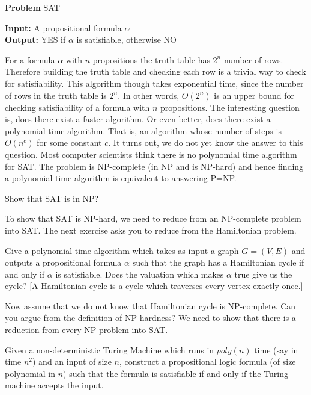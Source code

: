\begin{problem}
\caption*{{\bf Problem} SAT}
{\bf Input: } A propositional formula $\alpha$ \\
{\bf Output: } YES if $\alpha$ is satisfiable, otherwise NO
\label{prblm:sat}
\end{problem}

For a formula $\alpha$ with $n$ propositions the truth table has $2^n$ number of rows. Therefore building the truth table and checking each row is a trivial way to check for satisfiability. This algorithm though takes exponential time, since the number of rows in the truth table is $2^n$. 
In other words, $O(2^n)$ is an upper bound for checking satisfiability of a formula with $n$ propositions. The interesting question is, does there exist a faster algorithm. Or even better, does there exist a polynomial time algorithm. That is, an algorithm whose number of steps is $O(n^c)$ for some constant $c$. It turns out, we do not yet know the answer to this question. Most computer scientists think there is no polynomial time algorithm for SAT. The problem is NP-complete (in NP and is NP-hard) and hence finding a polynomial time algorithm is equivalent to answering P=NP. 

\begin{exercise}
\label{exercise:satisnp}
Show that SAT is in NP? 
\end{exercise}

To show that SAT is NP-hard, we need to reduce from an NP-complete problem into SAT. The next exercise asks you to reduce from the Hamiltonian problem.

\begin{exercise}
\label{exercise:satisnphard}
Give a polynomial time algorithm which takes as input a graph $G=(V,E)$ and outputs a propositional formula $\alpha$ such that the graph has a Hamiltonian cycle if and only if $\alpha$ is satisfiable. Does the valuation which makes $\alpha$ true give us the cycle? [A Hamiltonian cycle is a cycle which traverses every vertex exactly once.]
\end{exercise}

Now assume that we do not know that Hamiltonian cycle is NP-complete. Can you argue from the definition of NP-hardness? We need to show that there is a reduction from every NP problem into SAT. 

\begin{exercise}
Given a non-deterministic Turing Machine which runs in $poly(n)$ time (say in time $n^2$) and an input of size $n$, construct a propositional logic formula (of size polynomial in $n$) such that the formula is satisfiable if and only if the Turing machine accepts the input.
\end{exercise}

